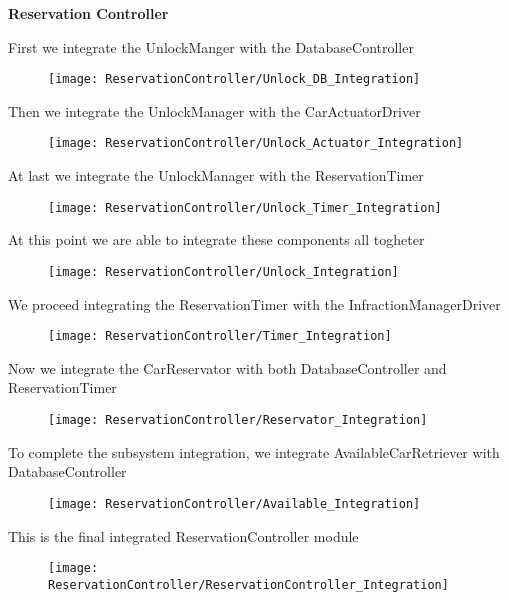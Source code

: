 


\begin{Large}
\textbf{Reservation Controller}
\end{Large}

First we integrate the UnlockManger with the DatabaseController
\begin{figure}[H]
\texttt{[image: ReservationController/Unlock\_DB\_Integration]}
\end{figure}

Then we integrate the UnlockManager with the CarActuatorDriver
\begin{figure}[H]
\texttt{[image: ReservationController/Unlock\_Actuator\_Integration]}
\end{figure}

At last we integrate the UnlockManager with the ReservationTimer
\begin{figure}[H]
\texttt{[image: ReservationController/Unlock\_Timer\_Integration]}
\end{figure}

At this point we are able to integrate these components all togheter
\begin{figure}[H]
\texttt{[image: ReservationController/Unlock\_Integration]}
\end{figure}

We proceed integrating the ReservationTimer with the InfractionManagerDriver
\begin{figure}[H]
\texttt{[image: ReservationController/Timer\_Integration]}
\end{figure}

Now we integrate the CarReservator with both DatabaseController and ReservationTimer
\begin{figure}[H]
\texttt{[image: ReservationController/Reservator\_Integration]}
\end{figure}

To complete the subsystem integration, we integrate AvailableCarRetriever with DatabaseController
\begin{figure}[H]
\texttt{[image: ReservationController/Available\_Integration]}
\end{figure}

This is the final integrated ReservationController module
\begin{figure}[H]
\texttt{[image: ReservationController/ReservationController\_Integration]}
\end{figure}